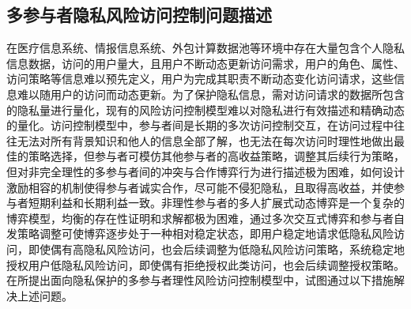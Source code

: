 \subsection{多参与者隐私风险访问控制问题描述}
\label{subsec:issues}
在医疗信息系统、情报信息系统、外包计算数据池等环境中存在大量包含个人隐私信息数据，访问的用户量大，且用户不断动态更新访问需求，用户的角色、属性、访问策略等信息难以预先定义，用户为完成其职责不断动态变化访问请求，这些信息难以随用户的访问而动态更新。为了保护隐私信息，需对访问请求的数据所包含的隐私量进行量化，现有的风险访问控制模型难以对隐私进行有效描述和精确动态的量化。访问控制模型中，参与者间是长期的多次访问控制交互，在访问过程中往往无法对所有背景知识和他人的信息全部了解，也无法在每次访问时理性地做出最佳的策略选择，但参与者可模仿其他参与者的高收益策略，调整其后续行为策略，但对非完全理性的多参与者间的冲突与合作博弈行为进行描述极为困难，如何设计激励相容的机制使得参与者诚实合作，尽可能不侵犯隐私，且取得高收益，并使参与者短期利益和长期利益一致。非理性参与者的多人扩展式动态博弈是一个复杂的博弈模型，均衡的存在性证明和求解都极为困难，通过多次交互式博弈和参与者自发策略调整可使博弈逐步处于一种相对稳定状态，即用户稳定地请求低隐私风险访问，即使偶有高隐私风险访问，也会后续调整为低隐私风险访问策略，系统稳定地授权用户低隐私风险访问，即使偶有拒绝授权此类访问，也会后续调整授权策略。
在所提出面向隐私保护的多参与者理性风险访问控制模型中，试图通过以下措施解决上述问题。

